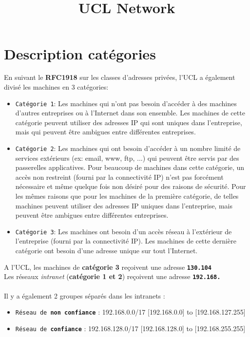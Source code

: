 \documentclass[10pt,a4paper]{article}
\title{UCL Network}
\begin{document}
\maketitle
\section{Description catégories}
En suivant le \textbf{RFC1918} sur les classes d'adresses privées, l'UCL a également divisé les machines en 3 catégories:
\begin{itemize}
\item \texttt{Catégorie 1}: Les machines qui n'ont pas besoin d'accéder à des machines d'autres entreprises ou à l'Internet dans son ensemble. Les machines de cette catégorie peuvent utiliser des adresses IP qui sont uniques dans l'entreprise, mais qui peuvent être ambigues entre différentes entreprises.
\item \texttt{Catégorie 2}: Les machines qui ont besoin d'accéder à un nombre limité de services extérieurs (ex: email, www, ftp, ...) qui peuvent être servis par des passerelles applicatives. Pour beaucoup de machines dans cette catégorie, un accès non restreint (fourni par la connectivité IP) n'est pas forcément nécessaire et même quelque fois non désiré pour des raisons de sécurité. Pour les mêmes raisons que pour les machines de la première catégorie, de telles machines peuvent utiliser des adresses IP uniques dans l'entreprise, mais peuvent être ambigues entre différentes entreprises.
\item \texttt{Catégorie 3}: Les machines ont besoin d'un accès réseau à l'extérieur de l'entreprise (fourni par la connectivité IP). Les machines de cette dernière catégorie ont besoin d'une adresse unique sur tout l'Internet.
\end{itemize}
A l'UCL, les machines de \textbf{catégorie 3} reçoivent une adresse \texttt{\textbf{130.104}}\\
Les réseaux \textit{intranet} (\textbf{catégorie 1 et 2}) reçoivent une adresse \texttt{\textbf{192.168.}}\\\\
Il y a également 2 groupes séparés dans les intranets :
\begin{itemize}
\item \texttt{Réseau de \textbf{non confiance}} : 192.168.0.0/17 [192.168.0.0] to [192.168.127.255]
\item \texttt{Réseau de \textbf{confiance}} : 192.168.128.0/17 [192.168.128.0] to [192.168.255.255]
\end{itemize}
\end{document}
